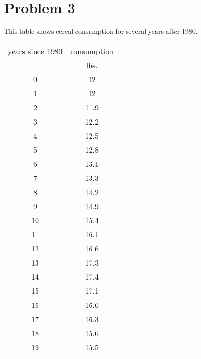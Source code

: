 \section*{Problem 3}


\begin{minipage}{0.29\textwidth}
    This table shows cereal consumption for several years after 1980.
    \begin{center}
        \renewcommand{\arraystretch}{1.2}
        \begin{tabular}{c|c}
            \toprule
            years since 1980 & consumption \\
                             & {lbs.} \\
            \midrule 
            0 & 12 \\
            1 & 12 \\ 
            2 & 11.9 \\ 
            3 & 12.2 \\ 
            4 & 12.5 \\ 
            5 & 12.8 \\
            6 & 13.1 \\
            7 & 13.3 \\
            8 & 14.2 \\
            9 & 14.9 \\
            10 & 15.4 \\
            11 & 16.1 \\
            12 & 16.6 \\
            13 & 17.3 \\
            14 & 17.4 \\
            15 & 17.1 \\
            16 & 16.6 \\
            17 & 16.3 \\
            18 & 15.6 \\
            19 & 15.5 \\
            \bottomrule
        \end{tabular}
    \end{center}
\end{minipage}
%
